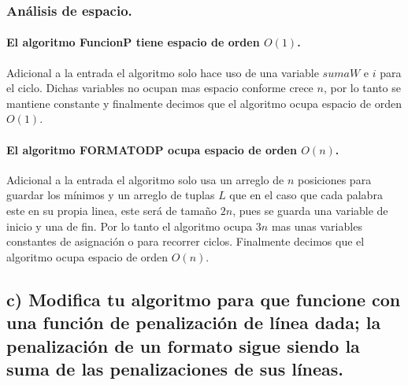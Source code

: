 \documentclass[12pt]{article}
\begin{document}
	\subsubsection{Análisis de espacio.}
	\paragraph{El algoritmo FuncionP tiene espacio de orden $O(1)$.} Adicional a la entrada el algoritmo solo hace uso de una variable $sumaW$ e $i$ para el ciclo. Dichas variables no ocupan mas espacio conforme crece $n$, por lo tanto se mantiene constante y finalmente decimos que el algoritmo ocupa espacio de orden $O(1)$.
	\paragraph{El algoritmo FORMATODP ocupa espacio de orden $O(n)$.} Adicional a la entrada el algoritmo solo usa un arreglo de $n$ posiciones para guardar los mínimos y un arreglo de tuplas $L$ que en el caso que cada palabra este en su propia linea, este será de tamaño $2n$, pues se guarda una variable de inicio y una de fin. Por lo tanto el algoritmo ocupa $3n$ mas unas variables constantes de asignación o para recorrer ciclos. Finalmente decimos que el algoritmo ocupa espacio de orden $O(n)$.
	\subsection{c) Modifica tu algoritmo para que funcione con una función de penalización de línea dada; la penalización de un formato sigue siendo la suma de las penalizaciones de sus líneas.}
\end{document}
